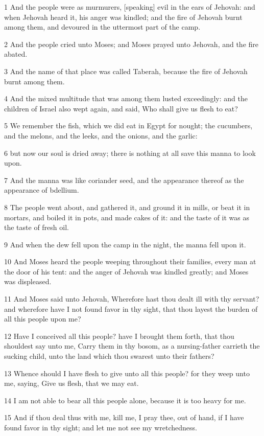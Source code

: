 \par 1 And the people were as murmurers, [speaking] evil in the ears of Jehovah: and when Jehovah heard it, his anger was kindled; and the fire of Jehovah burnt among them, and devoured in the uttermost part of the camp.
\par 2 And the people cried unto Moses; and Moses prayed unto Jehovah, and the fire abated.
\par 3 And the name of that place was called Taberah, because the fire of Jehovah burnt among them.
\par 4 And the mixed multitude that was among them lusted exceedingly: and the children of Israel also wept again, and said, Who shall give us flesh to eat?
\par 5 We remember the fish, which we did eat in Egypt for nought; the cucumbers, and the melons, and the leeks, and the onions, and the garlic:
\par 6 but now our soul is dried away; there is nothing at all save this manna to look upon.
\par 7 And the manna was like coriander seed, and the appearance thereof as the appearance of bdellium.
\par 8 The people went about, and gathered it, and ground it in mills, or beat it in mortars, and boiled it in pots, and made cakes of it: and the taste of it was as the taste of fresh oil.
\par 9 And when the dew fell upon the camp in the night, the manna fell upon it.
\par 10 And Moses heard the people weeping throughout their families, every man at the door of his tent: and the anger of Jehovah was kindled greatly; and Moses was displeased.
\par 11 And Moses said unto Jehovah, Wherefore hast thou dealt ill with thy servant? and wherefore have I not found favor in thy sight, that thou layest the burden of all this people upon me?
\par 12 Have I conceived all this people? have I brought them forth, that thou shouldest say unto me, Carry them in thy bosom, as a nursing-father carrieth the sucking child, unto the land which thou swarest unto their fathers?
\par 13 Whence should I have flesh to give unto all this people? for they weep unto me, saying, Give us flesh, that we may eat.
\par 14 I am not able to bear all this people alone, because it is too heavy for me.
\par 15 And if thou deal thus with me, kill me, I pray thee, out of hand, if I have found favor in thy sight; and let me not see my wretchedness.
